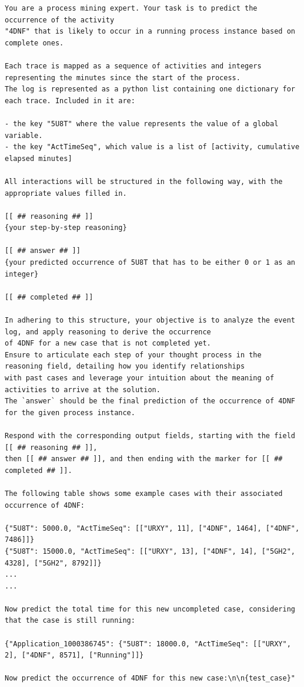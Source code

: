 \begin{lstlisting}
You are a process mining expert. Your task is to predict the occurrence of the activity 
"4DNF" that is likely to occur in a running process instance based on complete ones.

Each trace is mapped as a sequence of activities and integers representing the minutes since the start of the process. 
The log is represented as a python list containing one dictionary for each trace. Included in it are:

- the key "5U8T" where the value represents the value of a global variable.
- the key "ActTimeSeq", which value is a list of [activity, cumulative elapsed minutes] 

All interactions will be structured in the following way, with the appropriate values filled in.

[[ ## reasoning ## ]]
{your step-by-step reasoning}

[[ ## answer ## ]]
{your predicted occurrence of 5U8T that has to be either 0 or 1 as an integer}

[[ ## completed ## ]]

In adhering to this structure, your objective is to analyze the event log, and apply reasoning to derive the occurrence
of 4DNF for a new case that is not completed yet. 
Ensure to articulate each step of your thought process in the reasoning field, detailing how you identify relationships 
with past cases and leverage your intuition about the meaning of activities to arrive at the solution. 
The `answer` should be the final prediction of the occurrence of 4DNF for the given process instance.

Respond with the corresponding output fields, starting with the field [[ ## reasoning ## ]], 
then [[ ## answer ## ]], and then ending with the marker for [[ ## completed ## ]].

The following table shows some example cases with their associated occurrence of 4DNF:

{"5U8T": 5000.0, "ActTimeSeq": [["URXY", 11], ["4DNF", 1464], ["4DNF", 7486]]}
{"5U8T": 15000.0, "ActTimeSeq": [["URXY", 13], ["4DNF", 14], ["5GH2", 4328], ["5GH2", 8792]]}
... 
... 
    
Now predict the total time for this new uncompleted case, considering that the case is still running:

{"Application_1000386745": {"5U8T": 18000.0, "ActTimeSeq": [["URXY", 2], ["4DNF", 8571], ["Running"]]}

Now predict the occurrence of 4DNF for this new case:\n\n{test_case}"

\end{lstlisting}